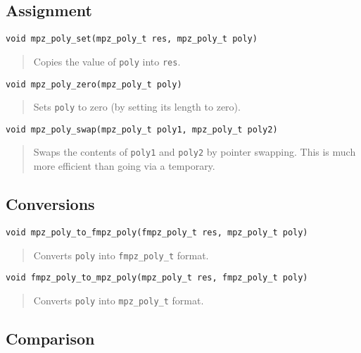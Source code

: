 \documentclass[a4paper,10pt]{article}
\newcommand{\code}{\lstinline}
\begin{document}
\subsection{Assignment}

\begin{lstlisting}
void mpz_poly_set(mpz_poly_t res, mpz_poly_t poly)
\end{lstlisting}
\begin{quote}
Copies the value of \code{poly} into \code{res}.
\end{quote}

\begin{lstlisting}
void mpz_poly_zero(mpz_poly_t poly)
\end{lstlisting}
\begin{quote}
Sets \code{poly} to zero (by setting its length to zero).
\end{quote}

\begin{lstlisting}
void mpz_poly_swap(mpz_poly_t poly1, mpz_poly_t poly2)
\end{lstlisting}
\begin{quote}
Swaps the contents of \code{poly1} and \code{poly2} by pointer swapping. This is much more efficient than going via a temporary.
\end{quote}


\subsection{Conversions}

\begin{lstlisting}
void mpz_poly_to_fmpz_poly(fmpz_poly_t res, mpz_poly_t poly)
\end{lstlisting}
\begin{quote}
Converts \code{poly} into \code{fmpz_poly_t} format.
\end{quote}

\begin{lstlisting}
void fmpz_poly_to_mpz_poly(mpz_poly_t res, fmpz_poly_t poly)
\end{lstlisting}
\begin{quote}
Converts \code{poly} into \code{mpz_poly_t} format.
\end{quote}



\subsection{Comparison}
\end{document}
